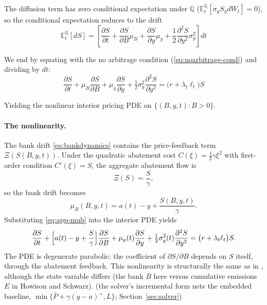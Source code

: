 \documentclass[11pt,letterpaper]{article}
\theoremstyle{plain}
\theoremstyle{definition}
\newcommand{\E}{\mathbb{E}}                  %
\newcommand{\Qmeasure}{\mathbb{Q}}           %
\numberwithin{equation}{section}
\begin{document}
The diffusion term has zero conditional expectation under $\Qmeasure$ ($\E_t^\Qmeasure[\sigma_y S_y dW_t]=0$), so the conditional expectation reduces to the drift
\begin{equation}
\E_t^\Qmeasure[dS]=[\frac{\partial S}{\partial t}+\frac{\partial S}{\partial B}\mu_B+\frac{\partial S}{\partial y}\mu_y +\frac{1}{2}\frac{\partial^2 S}{\partial y^2}\sigma_y^2]dt
\end{equation}

We end by equating with the no arbitrage condition (\ref{eq:noarbitrage-cond}) and dividing by $dt$:
\begin{equation}
  \frac{\partial S}{\partial t} + \mu_B\frac{\partial S}{\partial B}
  + \mu_y\frac{\partial S}{\partial y}
  + \tfrac{1}{2}\sigma_y^2\frac{\partial^2 S}{\partial y^2}
  = \bigl(r+\lambda_t\ell_t\bigr)S
\end{equation}

Yielding the nonlinear interior pricing PDE on $\{(B,y,t):B>0\}$.

\paragraph{The nonlinearity.}
The bank drift \eqref{eq:bankdynamics} contains the price-feedback term
$\Xi(S(B,y,t))$. Under the quadratic abatement cost $C(\xi)=\tfrac{1}{2}\gamma\xi^2$
with first-order condition $C'(\xi)=S$, the aggregate abatement flow is
\begin{equation}\label{eq:app-xi}
  \Xi(S)=\frac{S}{\gamma},
\end{equation}
so the bank drift becomes
\begin{equation}\label{eq:app-mub}
  \mu_B(B,y,t)=a(t)-y+\frac{S(B,y,t)}{\gamma}.
\end{equation}
Substituting \eqref{eq:app-mub} into the interior PDE yields
\begin{equation}\label{eq:app-semilinear}
  \frac{\partial S}{\partial t}
  + \Bigl[a(t)-y+\frac{S}{\gamma}\Bigr]\frac{\partial S}{\partial B}
  + \mu_y(t)\frac{\partial S}{\partial y}
  + \tfrac{1}{2}\sigma_y^2(t)\frac{\partial^2 S}{\partial y^2}
  = \bigl(r+\lambda_t\ell_t\bigr)S.
\end{equation}
The PDE is degenerate parabolic: the coefficient of $\partial S/\partial B$ depends on $S$ itself, through the abatement feedback. This nonlinearity is structurally the same as in \citet{howison2012}, although the state variable differs (the bank $B$ here versus cumulative emissions $E$ in Howison and Schwarz). (the solver's incremental form nets the embedded baseline, $\min\{\bar P+\gamma(y-a)^{+},L\}$; Section~\ref{sec:solver})
\end{document}
